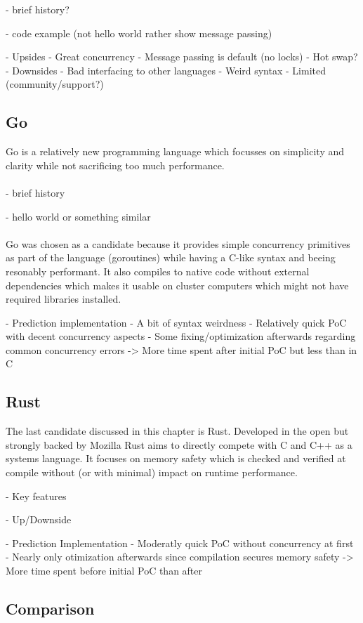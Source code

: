 - brief history?

- code example (not hello world rather show message passing)

- Upsides
    - Great concurrency
    - Message passing is default (no locks)
    - Hot swap?
- Downsides
    - Bad interfacing to other languages
    - Weird syntax
    - Limited (community/support?)


\subsection*{Go}
\label{ssec:Candidates.Go}
Go is a relatively new programming language which focusses on simplicity and clarity while not sacrificing too much performance.
\\ \\
- brief history

- hello world or something similar
\\ \\
Go was chosen as a candidate because it provides simple concurrency primitives as part of the language (goroutines) while having a C-like syntax and beeing resonably performant. It also compiles to native code without external dependencies which makes it usable on cluster computers which might not have required libraries installed.

- Prediction implementation
    - A bit of syntax weirdness
    - Relatively quick PoC with decent concurrency aspects
    - Some fixing/optimization afterwards regarding common concurrency errors
    -> More time spent after initial PoC but less than in C


\subsection*{Rust}
\label{ssec:Candidates.Rust}
The last candidate discussed in this chapter is Rust. Developed in the open but strongly backed by Mozilla Rust aims to directly compete with C and C++ as a systems language. It focuses on memory safety which is checked and verified at compile without (or with minimal) impact on runtime performance.

- Key features

- Up/Downside

- Prediction Implementation
    - Moderatly quick PoC without concurrency at first
    - Nearly only otimization afterwards since compilation secures memory safety
    -> More time spent before initial PoC than after


\subsection*{Comparison}
\label{ssec:Candidates.Comparison}

